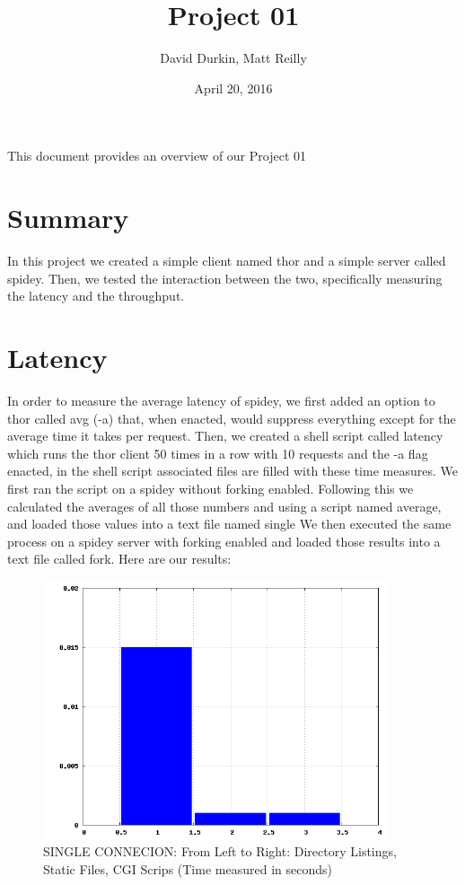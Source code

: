 \documentclass[letterpaper]{article}
\title{Project 01}
\date{April 20, 2016}
\author{David Durkin, Matt Reilly}
\begin{document}
\maketitle

This document provides an overview of our Project 01

\section*{Summary}

In this project we created a simple client named thor and a simple server called spidey. Then, we tested the interaction between the two, specifically measuring the latency and the throughput.

\section*{Latency}

In order to measure the average latency of spidey, we first added an option to thor called avg (-a) that, when enacted, would suppress everything except for the average time it takes per request. Then, we created a shell script called latency which runs the thor client 50 times in a row with 10 requests and the -a flag enacted, in the shell script associated files are filled with these time measures. We first ran the script on a spidey without forking enabled. Following this we calculated the averages of all those numbers and using a script named average, and loaded those values into a text file named single We then executed the same process on a spidey server with forking enabled and loaded those results into a text file called fork. Here are our results:

\begin{figure}[h!]
\centering
\includegraphics[width=4in]{single.png}
\caption{SINGLE CONNECION: From Left to Right: Directory Listings, Static Files, CGI Scrips (Time measured in seconds)}
\label{fig:Plot}
\end{figure}
\end{document}
